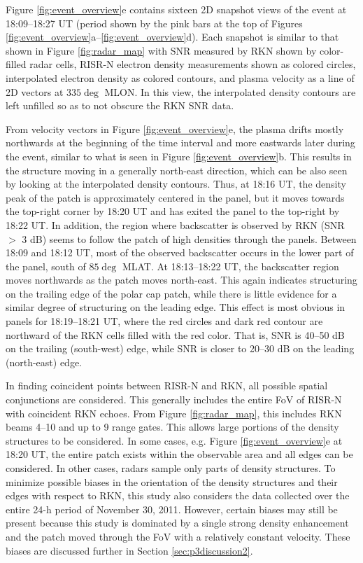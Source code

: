 Figure \ref{fig:event_overview}e contains sixteen 2D snapshot views of the event at 18:09--18:27 UT (period shown by the pink bars at the top of Figures \ref{fig:event_overview}a--\ref{fig:event_overview}d). Each snapshot is similar to that shown in Figure \ref{fig:radar_map} with SNR measured by RKN shown by color-filled radar cells, RISR-N electron density measurements shown as colored circles, interpolated electron density as colored contours, and plasma velocity as a line of 2D vectors at \(335\deg\) MLON. In this view, the interpolated density contours are left unfilled so as to not obscure the RKN SNR data.  

From velocity vectors in Figure \ref{fig:event_overview}e, the plasma drifts mostly northwards at the beginning of the time interval and more eastwards later during the event, similar to what is seen in Figure \ref{fig:event_overview}b. This results in the structure moving in a generally north-east direction, which can be also seen by looking at the interpolated density contours.  Thus, at 18:16 UT, the density peak of the patch is approximately centered in the panel, but it moves towards the top-right corner by 18:20 UT and has exited the panel to the top-right by 18:22 UT. In addition, the region where backscatter is observed by RKN (SNR \(>\) 3 dB) seems to follow the patch of high densities through the panels.  Between 18:09 and 18:12 UT, most of the observed backscatter occurs in the lower part of the panel, south of \(85\deg\) MLAT.  At 18:13--18:22 UT, the backscatter region moves northwards as the patch moves north-east.  This again indicates structuring on the trailing edge of the polar cap patch, while there is little evidence for a similar degree of structuring on the leading edge.  This effect is most obvious in panels for 18:19--18:21 UT, where the red circles and dark red contour are northward of the RKN cells filled with the red color.  That is, SNR is 40--50 dB on the trailing (south-west) edge, while SNR is closer to 20--30 dB on the leading (north-east) edge.

In finding coincident points between RISR-N and RKN, all possible spatial conjunctions are considered.  This generally includes the entire FoV of RISR-N with coincident RKN echoes.  From Figure \ref{fig:radar_map}, this includes RKN beams 4--10 and up to 9 range gates.  This allows large portions of the density structures to be considered.  In some cases, e.g. Figure \ref{fig:event_overview}e at 18:20 UT, the entire patch exists within the observable area and all edges can be considered.  In other cases, radars sample only parts of density structures.  To minimize possible biases in the orientation of the density structures and their edges with respect to RKN, this study also considers the data collected over the entire 24-h period of November 30, 2011.  However, certain biases may still be present because this study is dominated by a single strong density enhancement and the patch moved through the FoV with a relatively constant velocity.  These biases are discussed further in Section \ref{sec:p3discussion2}.

